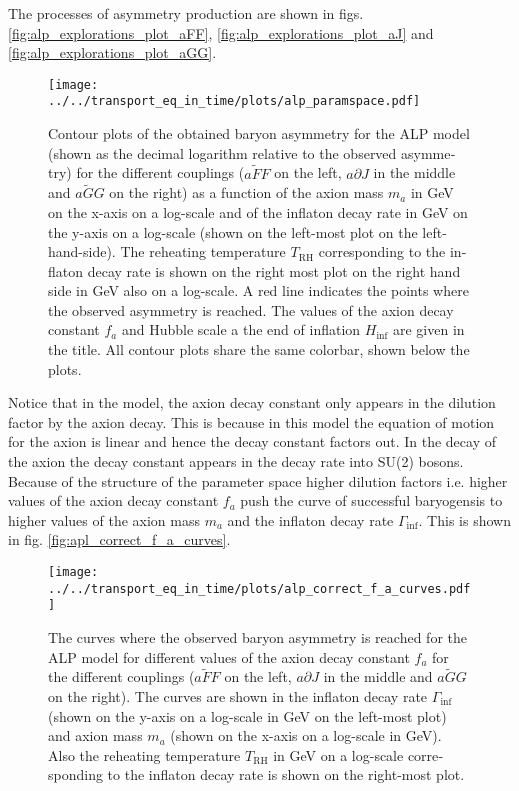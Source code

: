 \documentclass[master,       %
               twoside,        %
               BCOR10mm,       %
               english,ngerman, %
               ]{GAUBM}
\begin{document}
\begin{otherlanguage}{english}
The processes of asymmetry production are shown in figs. \ref{fig:alp_explorations_plot_aFF},  \ref{fig:alp_explorations_plot_aJ} and \ref{fig:alp_explorations_plot_aGG}.
\begin{figure}[H]
    \texttt{[image: ../../transport\_eq\_in\_time/plots/alp\_paramspace.pdf]}
    \caption{Contour plots of the obtained baryon asymmetry  for the ALP model (shown as the decimal logarithm relative to the observed asymmetry) for the different couplings ($a\tilde{F}F$ on the left, $a\partial J$ in the middle and $a \tilde{G} G$ on the right) as a function of the axion mass $m_a$ in GeV on the x-axis on a log-scale and of the inflaton decay rate in GeV on the y-axis on a log-scale (shown on the left-most plot on the left-hand-side). The reheating temperature $T_\mathrm{RH}$ corresponding to the inflaton decay rate is shown on the right most plot on the right hand side in GeV also on a log-scale. A red line indicates the points where the observed asymmetry is reached. The values of the axion decay constant $f_a$ and Hubble scale a the end of inflation $H_\mathrm{inf}$ are given in the title. All contour plots share the same colorbar, shown below the plots.}
    \label{fig:alp_paramspace}
\end{figure}
Notice that in the model, the axion decay constant only appears in the dilution factor by the axion decay.
This is because in this model the equation of motion for the axion is linear and hence the decay constant factors out. In the decay of the axion the decay constant appears in the decay rate into SU(2) bosons.
Because of the structure of the parameter space higher dilution factors i.e. higher values of the axion decay constant $f_a$ push the curve of successful baryogensis to higher values of the axion mass $m_a$ and the inflaton decay rate $\Gamma_\mathrm{inf}$. This is shown in fig. \ref{fig:apl_correct_f_a_curves}.
\begin{figure}[H]
	\texttt{[image: ../../transport\_eq\_in\_time/plots/alp\_correct\_f\_a\_curves.pdf]}
	\caption{The curves where the observed baryon asymmetry is reached for the ALP model for different values of the axion decay constant $f_a$ for the different couplings ($a \tilde{F} F$ on the left, $a \partial J$ in the middle and $a \tilde{G} G$ on the right). The curves are shown in the inflaton decay rate $\Gamma_\mathrm{inf}$ (shown on the y-axis on a log-scale in GeV on the left-most plot) and axion mass $m_a$ (shown on the x-axis on a log-scale in GeV). Also the reheating temperature $T_{\mathrm{RH}}$ in GeV on a log-scale corresponding to the inflaton decay rate is shown on the right-most plot.
}
\end{figure}
\end{otherlanguage}
\end{document}
